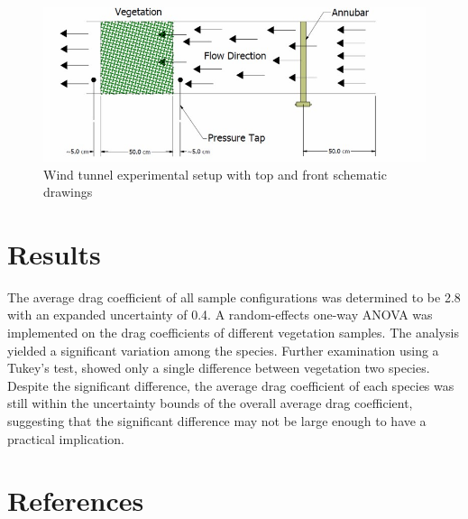 \documentclass[a4paper,11pt]{article}
\begin{document}
\begin{figure} [!]
	\centering 	
    \includegraphics[width=\textwidth,keepaspectratio]{Picture6a.jpg}
	\caption[Wind tunnel experimental setup]{Wind tunnel experimental setup with top and front schematic drawings }
	\label{fig:WindtunnelPic}
\end{figure}

\section{Results}
The average drag coefficient of all sample configurations was determined to be 2.8 with an expanded uncertainty of 0.4. A random-effects one-way ANOVA was implemented on the drag coefficients of different vegetation samples. The analysis yielded a significant variation among the species. Further examination using a Tukey’s test, showed only a single difference between vegetation two species. Despite the significant difference, the average drag coefficient of each species was still within the uncertainty bounds of the overall average drag coefficient, suggesting that the significant difference may not be large enough to have a practical implication.



\section*{References}


\end{document}
